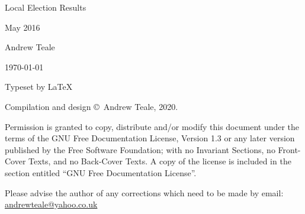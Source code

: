 \documentclass[a4paper,openany]{book}
\begin{document}

\begin{titlepage}

\begin{center}

\Huge Local Election Results

May 2016

\bigskip

\Large Andrew Teale

\vfill

\newcommand\versionno{0.10.1}


\today

\end{center}

\end{titlepage}


\begin{center}

\bigskip

Typeset by \LaTeX{}

\bigskip

Compilation and design \copyright\ Andrew Teale, 2020.

    Permission is granted to copy, distribute and/or modify this document
    under the terms of the GNU Free Documentation License, Version 1.3
    or any later version published by the Free Software Foundation;
    with no Invariant Sections, no Front-Cover Texts, and no Back-Cover Texts.
    A copy of the license is included in the section entitled ``GNU
    Free Documentation License''.

\bigskip


\bigskip

Please advise the author of any corrections which need to be made by
email: \url{andrewteale@yahoo.co.uk}

\vfill
\end{center}

\tableofcontents


\end{document}

